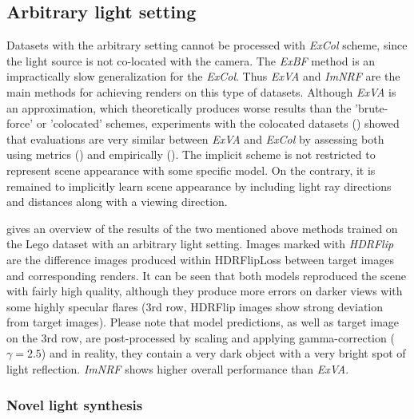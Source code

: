 \subsection{Arbitrary light setting}

Datasets with the arbitrary setting cannot be processed with \textit{ExCol} scheme,
since the light source is not co-located with the camera.
The \textit{ExBF} method is an impractically slow generalization for the \textit{ExCol}.
Thus \textit{ExVA} and \textit{ImNRF} are the main methods for achieving renders on this type of datasets.
Although \textit{ExVA} is an approximation,
which theoretically produces worse results than the 'brute-force' or 'colocated' schemes,
experiments with the colocated datasets () showed
that evaluations are very similar between \textit{ExVA} and \textit{ExCol}
by assessing both using metrics () and empirically ().
The implicit scheme is not restricted to represent scene appearance with some specific model.
On the contrary, it is remained to implicitly learn scene appearance
by including light ray directions and distances along with a viewing direction.

 gives an overview of the results of the two mentioned above methods
trained on the Lego dataset with an arbitrary light setting.
Images marked with \textit{HDRFlip} are the difference images produced within HDRFlipLoss \cite{andersson2020flip, theisel2021hdrflip}
between target images and corresponding renders.
It can be seen that both models reproduced the scene with fairly high quality,
although they produce more errors on darker views with some highly specular flares (3rd row, HDRFlip images show strong deviation from target images).
Please note that model predictions, as well as target image on the 3rd row,
are post-processed by scaling and applying gamma-correction ($\gamma = 2.5$)
and in reality, they contain a very dark object with a very bright spot of light reflection.
\textit{ImNRF} shows higher overall performance than \textit{ExVA}.


\subsubsection{Novel light synthesis}

